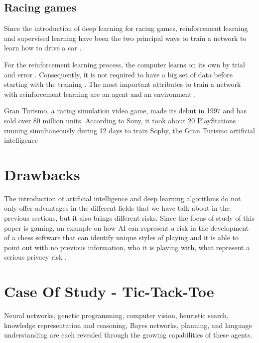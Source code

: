 \documentclass[conference]{IEEEtran}
\begin{document}
\subsection{Racing games}

Since the introduction of deep learning for racing games, reinforcement learning and supervised learning have been the two principal ways to train a network to learn how to drive a car \cite{racingpdf}.

For the reinforcement learning process, the computer learns on its own by trial and error \cite{racingpdf}. Consequently, it is not required to have a big set of data before starting with the training \cite{racingpdf}. The most important attributes to train a network with reinforcement learning are an agent and an environment \cite{racingpdf}.

Gran Turismo, a racing simulation video game, made its debut in 1997 and has sold over 80 million units.
According to Sony, it took about 20 PlayStations running simultaneously during 12 days to train Sophy, the Gran Turismo artificial intelligence 


\section{Drawbacks}

The introduction of artificial intelligence and deep learning algorithms do not only offer advantages in the different fields that we have talk about in the previous sections, but it also brings different risks. Since the focus of study of this paper is gaming, an example on how AI can represent a risk in the development of a chess software that can identify unique styles of playing and it is able to point out with no previous information, who it is playing with, what represent a serious privacy risk \cite{unmask}.

\section{Case Of Study - Tic-Tack-Toe}



Neural networks, genetic programming, computer vision, heuristic search, knowledge representation and reasoning, Bayes networks, planning, and language understanding are each revealed through the growing capabilities of these agents.
\end{document}
